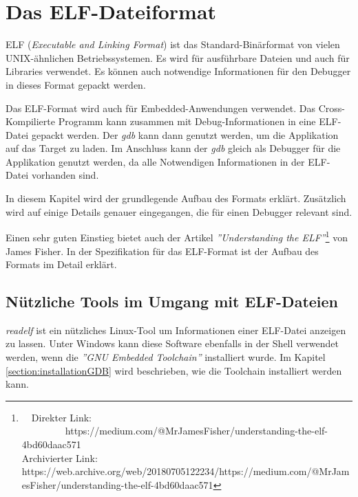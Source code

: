 \chapter{Das ELF-Dateiformat}
ELF (\textit{Executable and Linking Format}) ist das Standard-Binärformat von vielen UNIX-ähnlichen Betriebssystemen.
Es wird für ausführbare Dateien und auch für Libraries verwendet.
Es können auch notwendige Informationen für den Debugger in dieses Format gepackt werden.

Das ELF-Format wird auch für Embedded-Anwendungen verwendet.
Das Cross-Kompilierte Programm kann zusammen mit Debug-Informationen in eine ELF-Datei gepackt werden.
Der \textit{gdb} kann dann genutzt werden, um die Applikation auf das Target zu laden.
Im Anschluss kann der \textit{gdb} gleich als Debugger für die Applikation genutzt werden, da alle Notwendigen Informationen in der ELF-Datei vorhanden sind.

In diesem Kapitel wird der grundlegende Aufbau des Formats erklärt.
Zusätzlich wird auf einige Details genauer eingegangen, die für einen Debugger relevant sind.

Einen sehr guten Einstieg bietet auch der Artikel \textit{''Understanding the ELF''}\footnote{\ \ Direkter Link: \ \ \ \ \ \ \ \ \ https://medium.com/@MrJamesFisher/understanding-the-elf-4bd60daac571\\ Archivierter Link: https://web.archive.org/web/20180705122234/https://medium.com/@MrJamesFisher/understanding-the-elf-4bd60daac571} von James Fisher.
In der Spezifikation für das ELF-Format\cite{bib:ELFSpecification} ist der Aufbau des Formats im Detail erklärt.


\section{Nützliche Tools im Umgang mit ELF-Dateien}
\textit{readelf} ist ein nützliches Linux-Tool um Informationen einer ELF-Datei anzeigen zu lassen.
Unter Windows kann diese Software ebenfalls in der Shell verwendet werden, wenn die \textit{''GNU Embedded Toolchain''} installiert wurde.
Im Kapitel \ref{section:installationGDB} wird beschrieben, wie die Toolchain installiert werden kann.


